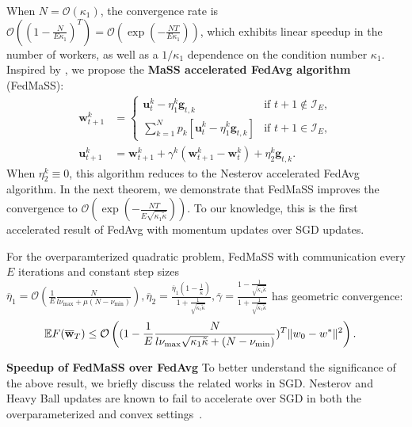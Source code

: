 When $N=\mathcal{O}(\kappa_{1})$, the convergence rate is $\mathcal{O}((1-\frac{N}{E\kappa_{1}})^{T})=\mathcal{O}(\exp(-\frac{NT}{E\kappa_{1}}))$,
which exhibits linear speedup in the number of workers, as well as
a $1/\kappa_{1}$ dependence on the condition number $\kappa_{1}$.
Inspired by \cite{liu2018accelerating}, we propose the \textbf{MaSS
	accelerated FedAvg algorithm} (FedMaSS):
\begin{align*}
\mathbf{w}_{t+1}^{k} & =\begin{cases}
\mathbf{u}_{t}^{k}-\eta_{1}^{k}\mathbf{g}_{t,k} & \text{if }t+1\notin\mathcal{I}_{E},\\
\sum_{k=1}^{N}p_{k}\left[\mathbf{u}_{t}^{k}-\eta_{1}^{k}\mathbf{g}_{t,k}\right] & \text{if }t+1\in\mathcal{I}_{E},
\end{cases}\\
\mathbf{u}_{t+1}^{k} & =\mathbf{w}_{t+1}^{k}+\gamma^{k}(\mathbf{w}_{t+1}^{k}-\mathbf{w}_{t}^{k})+\eta_{2}^{k}\mathbf{g}_{t,k}. 
\end{align*}
When $\eta_{2}^{k}\equiv0$, this algorithm reduces to the Nesterov
accelerated FedAvg algorithm. In the next theorem, we demonstrate
that FedMaSS improves the convergence to $\mathcal{O}(\exp(-\frac{NT}{E\sqrt{\kappa_{1}\tilde{\kappa}}}))$.
To our knowledge, this is the first accelerated result of
FedAvg with momentum updates over SGD updates.
\begin{theorem}
	\label{thm:overparameterized_MaSS}For the overparamterized quadratic
	problem, FedMaSS with communication every $E$ iterations and constant
	step sizes $\overline{\eta}_1=\mathcal{O}(\frac{1}{E}\frac{N}{l\nu_{\max}+\mu(N-\nu_{\min})}),\overline{\eta}_{2}=\frac{\overline{\eta}_{1}(1-\frac{1}{\tilde{\kappa}})}{1+\frac{1}{\sqrt{\kappa_{1}\tilde{\kappa}}}},\overline{\gamma}=\frac{1-\frac{1}{\sqrt{\kappa_{1}\tilde{\kappa}}}}{1+\frac{1}{\sqrt{\kappa_{1}\tilde{\kappa}}}}$
	has geometric convergence:
	\begin{align*}
	\mathbb{E}F(\overline{{\mathbf{w}}}_{T}) & \leq\mathcal{O}\left((1-\frac{1}{E}\frac{N}{l\nu_{\max}\sqrt{\kappa_{1}\tilde{\kappa}}+(N-\nu_{\min})})^{T}\|w_{0}-w^{\ast}\|^{2}\right).
	\end{align*}
\end{theorem}
\textbf{Speedup of FedMaSS over FedAvg} 
To better understand the significance of the above result, we briefly discuss the related works in SGD.
Nesterov and Heavy Ball updates are known to fail to accelerate over SGD in both the overparameterized
and convex settings~\cite{liu2018accelerating,kidambi2018insufficiency,liu2018toward,yuan2016influence}.
